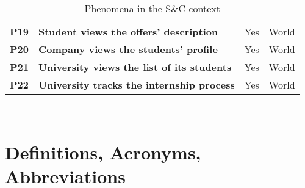 \begin{table}[H]
\begin{tabular}{|c|p{20em}|c|c|}
    \textbf{P19} & \textbf{Student views the offers' description} & Yes & World \T\B \\
    \textbf{P20} & \textbf{Company views the students' profile} & Yes & World \T\B\\
    \textbf{P21} & \textbf{University views the list of its students} & Yes & World \B\\
    \textbf{P22} & \textbf{University tracks the internship process} & Yes & World \T\B\\
    \hline
    \end{tabular}
    \\[10pt]
    \caption{Phenomena in the S\&C context}\label{table:phenomena}
\end{table}

\section{Definitions, Acronyms, Abbreviations}\label{sec:definitions}
